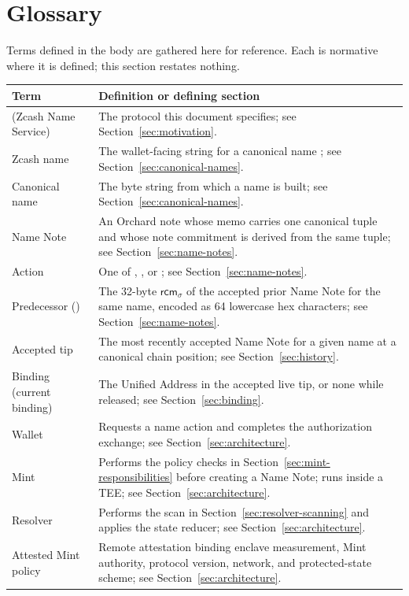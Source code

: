 \section{Glossary}
\label{sec:glossary}

Terms defined in the body are gathered here for reference. Each is normative where it is defined; this section restates nothing.

\begin{center}
\begin{tabularx}{\textwidth}{@{}L{0.28\textwidth}Y@{}}
\toprule
Term & Definition or defining section \\
\midrule
\zns{} (Zcash Name Service) & The protocol this document specifies; see Section~\ref{sec:motivation}. \\
Zcash name & The wallet-facing string  for a canonical name ; see Section~\ref{sec:canonical-names}. \\
Canonical name & The byte string from which a \zns{} name is built; see Section~\ref{sec:canonical-names}. \\
Name Note & An Orchard note whose memo carries one canonical \zns{} tuple and whose note commitment is derived from the same tuple; see Section~\ref{sec:name-notes}. \\
Action & One of , , or ; see Section~\ref{sec:name-notes}. \\
Predecessor () & The 32-byte \(\mathsf{rcm}_\sigma\) of the accepted prior Name Note for the same name, encoded as 64 lowercase hex characters; see Section~\ref{sec:name-notes}. \\
Accepted tip & The most recently accepted Name Note for a given name at a canonical chain position; see Section~\ref{sec:history}. \\
Binding (current binding) & The Unified Address in the accepted live tip, or none while released; see Section~\ref{sec:binding}. \\
Wallet & Requests a name action and completes the authorization exchange; see Section~\ref{sec:architecture}. \\
Mint & Performs the policy checks in Section~\ref{sec:mint-responsibilities} before creating a Name Note; runs inside a TEE; see Section~\ref{sec:architecture}. \\
Resolver & Performs the scan in Section~\ref{sec:resolver-scanning} and applies the state reducer; see Section~\ref{sec:architecture}. \\
Attested Mint policy & Remote attestation binding enclave measurement, Mint authority, protocol version, network, and protected-state scheme; see Section~\ref{sec:architecture}. \\

\end{tabularx}
\end{center}
